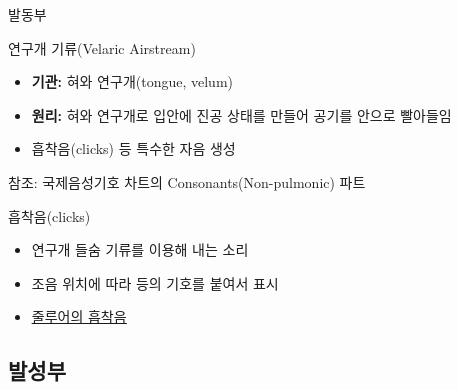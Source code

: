 \documentclass[11pt, aspectratio=169]{beamer}
\newcommand{\textds}[1]{{\ipafont #1}}
\begin{document}
\begin{frame}[t]{발동부}
    \begin{block}{연구개 기류(Velaric Airstream)}
        \begin{itemize}
            \item \textbf{기관:} 혀와 연구개(tongue, velum)
            \item \textbf{원리:} 혀와 연구개로 입안에 진공 상태를 만들어 공기를 안으로 빨아들임
            \item 흡착음(clicks) 등 특수한 자음 생성
        \end{itemize}
    \end{block}
    참조: 국제음성기호 차트의 Consonants(Non-pulmonic) 파트
    \begin{block}{흡착음(clicks)}
        \begin{itemize}
            \item 연구개 들숨 기류를 이용해 내는 소리
            \item 조음 위치에 따라 \textds{[ʘ] [ǀ] [ǁ] [ǂ] [ǃ]} 등의 기호를 붙여서 표시
            \item {} \href{https://www.phonetics.ucla.edu/course/chapter6/zulu/zulu.html}{\underline{줄루어의 흡착음}}
        \end{itemize}
    \end{block}
\end{frame}

\subsection{발성부}
\end{document}

